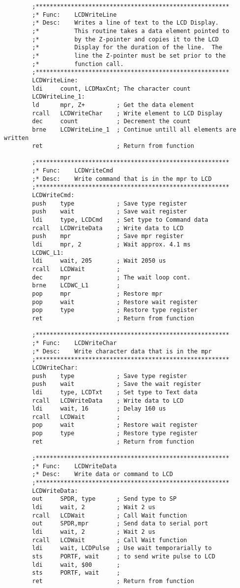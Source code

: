 \documentclass[12pt,letterpaper]{article}
\begin{document}
\begin{verbatim}
	    ;*******************************************************
	    ;* Func:	LCDWriteLine
	    ;* Desc:	Writes a line of text to the LCD Display.
	    ;*			This routine takes a data element pointed to
	    ;*			by the Z-pointer and copies it to the LCD 
	    ;*			Display for the duration of the line.  The
	    ;*			line the Z-pointer must be set prior to the 
	    ;*			function call.
	    ;*******************************************************
	    LCDWriteLine:
	    ldi		count, LCDMaxCnt; The character count
	    LCDWriteLine_1:
	    ld		mpr, Z+			; Get the data element
	    rcall	LCDWriteChar	; Write element to LCD Display
	    dec		count			; Decrement the count
	    brne	LCDWriteLine_1	; Continue untill all elements are written
	    ret						; Return from function
	    
	    ;*******************************************************
	    ;* Func:	LCDWriteCmd
	    ;* Desc:	Write command that is in the mpr to LCD 
	    ;*******************************************************
	    LCDWriteCmd:
	    push	type			; Save type register
	    push	wait			; Save wait register
	    ldi		type, LCDCmd	; Set type to Command data
	    rcall	LCDWriteData	; Write data to LCD
	    push	mpr				; Save mpr register
	    ldi		mpr, 2			; Wait approx. 4.1 ms
	    LCDWC_L1:
	    ldi		wait, 205		; Wait 2050 us
	    rcall	LCDWait			;
	    dec		mpr				; The wait loop cont.
	    brne	LCDWC_L1		;
	    pop		mpr				; Restore mpr
	    pop		wait			; Restore wait register
	    pop		type			; Restore type register
	    ret						; Return from function
	    
	    ;*******************************************************
	    ;* Func:	LCDWriteChar
	    ;* Desc:	Write character data that is in the mpr
	    ;*******************************************************
	    LCDWriteChar:
	    push	type			; Save type register
	    push	wait			; Save the wait register
	    ldi		type, LCDTxt	; Set type to Text data
	    rcall	LCDWriteData	; Write data to LCD
	    ldi		wait, 16		; Delay 160 us
	    rcall	LCDWait			;
	    pop		wait			; Restore wait register
	    pop		type			; Restore type register
	    ret						; Return from function
	    
	    ;*******************************************************
	    ;* Func:	LCDWriteData
	    ;* Desc:	Write data or command to LCD 
	    ;*******************************************************
	    LCDWriteData:
	    out		SPDR, type		; Send type to SP
	    ldi		wait, 2			; Wait 2 us
	    rcall	LCDWait			; Call Wait function
	    out		SPDR,mpr		; Send data to serial port
	    ldi		wait, 2			; Wait 2 us
	    rcall	LCDWait			; Call Wait function
	    ldi		wait, LCDPulse	; Use wait temporarially to 
	    sts		PORTF, wait		; to send write pulse to LCD
	    ldi		wait, $00		;
	    sts		PORTF, wait		;
	    ret						; Return from function
	    

\end{verbatim}
\end{document}
